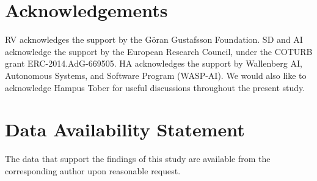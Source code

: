 \section*{Acknowledgements}
RV acknowledges the support by the G\"oran Gustafsson Foundation.
SD and AI acknowledge the support by the European Research Council, under the COTURB grant ERC-2014.AdG-669505.
HA acknowledges the support by Wallenberg AI, Autonomous Systems, and Software Program (WASP-AI).
We would also like to acknowledge Hampus Tober for useful discussions throughout the present study.

\section*{Data Availability Statement}
The data that support the findings of this study are available from the corresponding author upon reasonable request.


%
%
%
